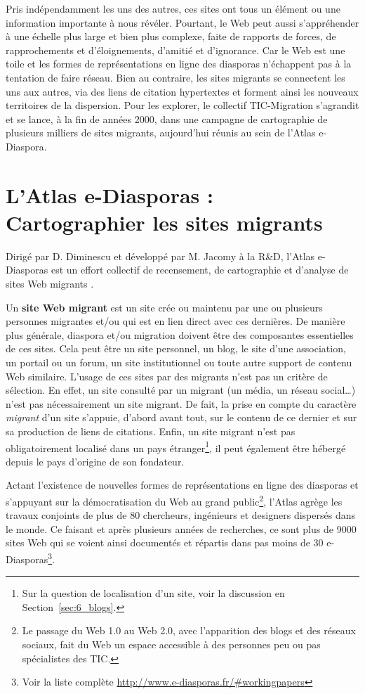 \documentclass[symmetric,justified,marginals=raggedouter]{tufte-book}
\begin{document}
Pris indépendamment les uns des autres, ces sites ont tous un élément ou une information importante à nous révéler. Pourtant, le Web peut aussi s'appréhender à une échelle plus large et bien plus complexe, faite de rapports de forces, de rapprochements et d'éloignements, d'amitié et d'ignorance. Car le Web est une toile et les formes de représentations en ligne des diasporas n'échappent pas à la tentation de faire réseau. Bien au contraire, les sites migrants se connectent les uns aux autres, via des liens de citation hypertextes et forment ainsi les nouveaux territoires de la dispersion. Pour les explorer, le collectif TIC-Migration s'agrandit et se lance, à la fin de années 2000, dans une campagne de cartographie de plusieurs milliers de sites migrants, aujourd'hui réunis au sein de l'Atlas e-Diaspora.  

\section{L'Atlas e-Diasporas : Cartographier les sites migrants}
\label{sec:2_atlas}

\noindent Dirigé par D. Diminescu et développé par M. Jacomy à la R\&D, l'Atlas e-Diasporas est un effort collectif de recensement, de cartographie et d'analyse de sites Web migrants \citep{diminescu_e-diasporas_2012}.

Un \textbf{site Web migrant} est un site crée ou maintenu par une ou plusieurs personnes migrantes et/ou qui est en lien direct avec ces dernières. De manière plus générale, diaspora et/ou migration doivent être des composantes essentielles de ces sites. Cela peut être un site personnel, un blog, le site d'une association, un portail ou un forum, un site institutionnel ou toute autre support de contenu Web similaire. L'usage de ces sites par des migrants n'est pas un critère de sélection. En effet, un site consulté par un migrant (un média, un réseau social\ldots{}) n'est pas nécessairement un site migrant. De fait, la prise en compte du caractère \textit{migrant} d'un site s'appuie, d'abord avant tout, sur le contenu de ce dernier et sur sa production de liens de citations. Enfin, un site migrant n'est pas obligatoirement localisé dans un pays étranger\footnote{\RaggedOuter Sur la question de localisation d'un site, voir la discussion en Section~\ref{sec:6_blogs}.}, il peut également être hébergé depuis le pays d'origine de son fondateur. 

Actant l'existence de nouvelles formes de représentations en ligne des diasporas et s'appuyant sur la démocratisation du Web au grand public\footnote{\RaggedOuter Le passage du Web 1.0 au Web 2.0, avec l'apparition des blogs et des réseaux sociaux, fait du Web un espace accessible à des personnes peu ou pas spécialistes des TIC.}, l'Atlas agrège les travaux conjoints de plus de 80 chercheurs, ingénieurs et designers dispersés dans le monde. Ce faisant et après plusieurs années de recherches, ce sont plus de 9000 sites Web qui se voient ainsi documentés et répartis dans pas moins de 30 e-Diasporas\footnote{\RaggedOuter Voir la liste complète \url{http://www.e-diasporas.fr/\#workingpapers}}.
\end{document}
